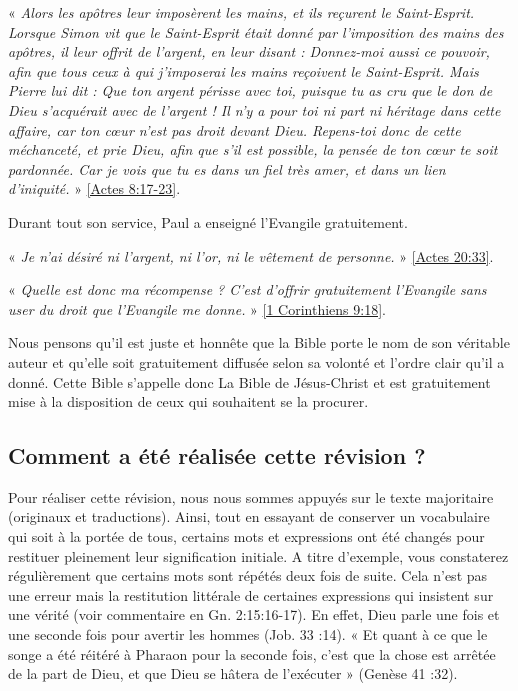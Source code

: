 \begin{small}
« \emph{Alors les apôtres leur imposèrent les mains, et ils reçurent le Saint-Esprit. Lorsque Simon vit que le Saint-Esprit était donné par l'imposition des mains des apôtres, il leur offrit de l'argent, en leur disant : Donnez-moi aussi ce pouvoir, afin que tous ceux à qui j'imposerai les mains reçoivent le Saint-Esprit. Mais Pierre lui dit : Que ton argent périsse avec toi, puisque tu as cru que le don de Dieu s'acquérait avec de l'argent ! Il n'y a pour toi ni part ni héritage dans cette affaire, car ton cœur n'est pas droit devant Dieu. Repens-toi donc de cette méchanceté, et prie Dieu, afin que s'il est possible, la pensée de ton cœur te soit pardonnée. Car je vois que tu es dans un fiel très amer, et dans un lien d'iniquité.} » \vref{Actes 8:17-23}.

Durant tout son service, Paul a enseigné l'Evangile gratuitement.

« \emph{Je n'ai désiré ni l'argent, ni l'or, ni le vêtement de personne.} » \vref{Actes 20:33}.

« \emph{Quelle est donc ma récompense ? C'est d'offrir gratuitement l'Evangile sans user du droit que l'Evangile me donne.} » \vref{1 Corinthiens 9:18}.

Nous pensons qu'il est juste et honnête que la Bible porte le nom de son véritable auteur et qu'elle soit gratuitement diffusée selon sa volonté et l'ordre clair qu'il a donné. Cette Bible s'appelle donc La Bible de Jésus-Christ et est gratuitement mise à la disposition de ceux qui souhaitent se la procurer. 

\subsection*{Comment a été réalisée cette révision ?}

Pour réaliser cette révision, nous nous sommes appuyés sur le texte majoritaire (originaux et traductions). Ainsi, tout en essayant de conserver un vocabulaire qui soit à la portée de tous, certains mots et expressions ont été changés pour restituer pleinement leur signification initiale. A titre d’exemple, vous constaterez régulièrement que certains mots sont répétés deux fois de suite. Cela n’est pas une erreur mais la restitution littérale de certaines expressions qui insistent sur une vérité (voir commentaire en Gn. 2:15:16-17). En effet, Dieu parle une fois et une seconde fois pour avertir les hommes (Job. 33 :14). « Et quant à ce que le songe a été réitéré à Pharaon pour la seconde fois, c’est que la chose est arrêtée de la part de Dieu, et que Dieu se hâtera de l’exécuter » (Genèse 41 :32).


\end{small}
